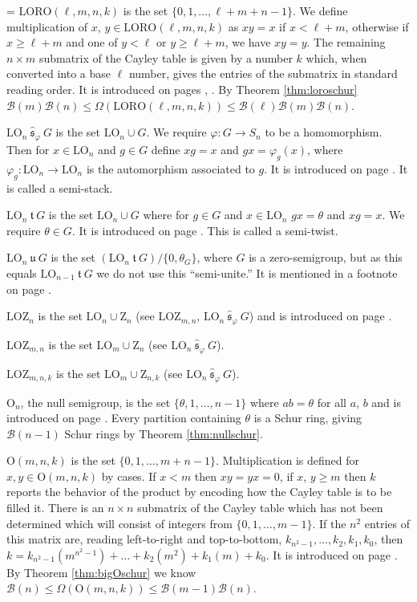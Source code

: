 \documentclass{article}
\makeatletter
\newcommand{\hangpara}[2]{\hangindent#1\hangafter#2\noindent}
\newenvironment{hangparas}[2]{\setlength{\parindent}{\z@}
  \everypar={\hangpara{#1}{#2}}}{\par}
\theoremstyle{plain}
\theoremstyle{definition}
\newcommand{\thmref}[1]{Theorem \ref{#1}}
\newcommand{\B}{\mathscr{B}}
\renewcommand{\O}{\mathrm{O}}
\newcommand{\LO}{\mathrm{LO}}
\newcommand{\LOZ}{\mathrm{LOZ}}
\newcommand{\LORO}{\mathrm{LORO}}
\newcommand{\z}{\mathrm{Z}}
\newcommand{\shat}{\ \hat{\mathfrak{s}}_\varphi\ }
\renewcommand{\t}{\ \mathfrak{t}\ }
\renewcommand{\u}{\ \mathfrak{u}\ }
\makeatother
\begin{document}
\begin{hangparas}{15pt}{1}
$\LORO(\ell,m,n,k)$ is the set $\{0,1,\ldots, \ell+m+n-1\}$. We define multiplication of $x$, $y\in \LORO(\ell, m, n, k)$ as $xy=x$ if $x<\ell+m$, otherwise if $x\geq \ell+m$ and one of $y< \ell$ or $y\geq \ell+m$, we have $xy=y$. The remaining $n\times m$ submatrix of the Cayley table is given by a number $k$ which, when converted into a base $\ell$ number, gives the entries of the submatrix in standard reading order. It is introduced on pages \pageref{semistack}, \pageref{loro}. By \thmref{thm:loroschur} $\B(m)\B(n) \le \Omega(\LORO(\ell,m,n,k))\le \B(\ell)\B(m)\B(n)$.

$\LO_n \shat G$ is the set $\LO_n \cup G$. We require $\varphi: G\to S_n$ to be a homomorphism. Then for $x\in \LO_n$ and $g\in G$ define $xg=x$ and $gx=\varphi_g(x)$, where $\varphi_g\colon \LO_n\rightarrow \LO_n$ is the automorphism associated to $g$. It is introduced on page \pageref{semistack}. It is called a semi-stack.

$\LO_n \t G$ is the set $\LO_n\cup G$ where for $g\in G$ and $x\in \LO_n$ $gx=\theta$ and $xg=x$. We require $\theta\in G$. It is introduced on page \pageref{semitwist}. This is called a semi-twist.

$\LO_n \u G$ is the set $(\LO_n \t G)/\{0, \theta_G\}$, where $G$ is a zero-semigroup, but as this equals $\LO_{n-1}\t G$ we do not use this ``semi-unite.'' It is mentioned in a footnote on page \pageref{semiunite}.

$\LOZ_n$ is the set $\LO_n\cup\z_n$ (see $\LOZ_{m,n}$, $\LO_n \shat G$) and is introduced on page \pageref{lozn}.

$\LOZ_{m,n}$ is the set $\LO_m \cup \z_n$ (see $\LO_n \shat G$).

$\LOZ_{m,n,k}$ is the set $\LO_m \cup \z_{n,k}$ (see $\LO_n \shat G$).%

$\O_n$, the null semigroup, is the set $\{\theta, 1, \ldots, n-1\}$ where $ab=\theta$ for all $a$, $b$ and is introduced on page \pageref{null}. Every partition containing $\theta$ is a Schur ring, giving $\B(n-1)$ Schur rings by \thmref{thm:nullschur}.

$\O(m,n,k)$ is the set $\{0,1,\ldots, m+n-1\}$. Multiplication is defined for $x,y\in \O(m,n,k)$ by cases. If $x<m$ then $xy=yx=0$, if $x$, $y\geq m$ then $k$ reports the behavior of the product by encoding how the Cayley table is to be filled it. There is an $n\times n$ submatrix of the Cayley table which has not been determined which will consist of integers from $\{0, 1, \ldots, m-1\}$. If the $n^2$ entries of this matrix are, reading left-to-right and top-to-bottom, $k_{n^2-1},\ldots, k_2, k_1, k_0$, then $k = k_{n^2-1}(m^{n^2-1}) + \ldots + k_2(m^2)+ k_1(m) + k_0$. It is introduced on page \pageref{bigO}. By \thmref{thm:bigOschur} we know $\B(n) \le \Omega(\O(m,n,k))\le \B(m-1)\B(n)$.


\end{hangparas}
\end{document}
